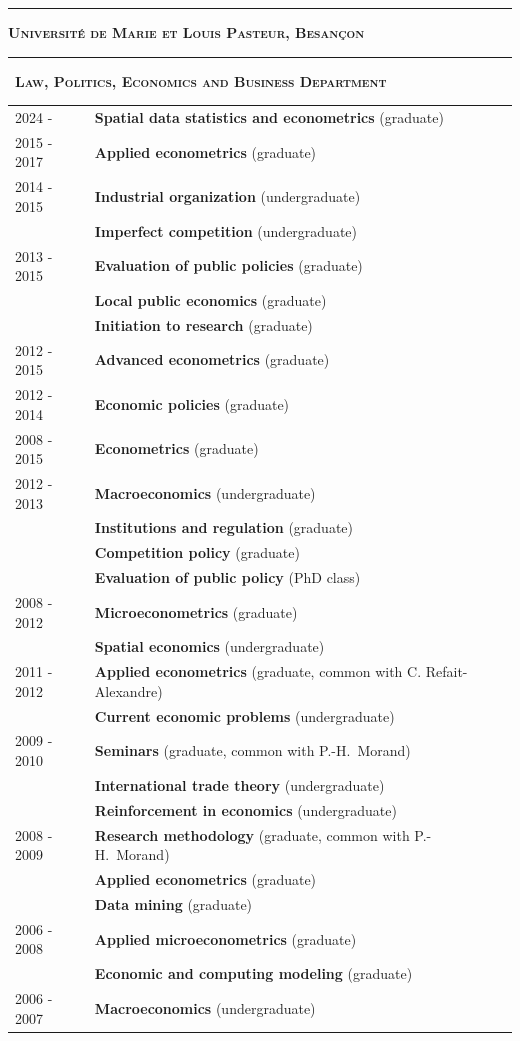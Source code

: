 \documentclass[a4paper,12pt]{article}
\newcommand{\titre}[1]{%
	\bigskip
	\noindent \rule[2mm]{\textwidth}{0.5pt}
	\textbf{\textsc{\large #1}} \\
	\noindent \rule[1mm]{\textwidth}{0.5pt}
	}
\newcommand{\smalltitre}[1]{%
	\noindent \textbullet~\textsc{\textbf{#1}}
	\smallskip
	}
\begin{document}
\titre{Université de Marie et Louis Pasteur, Besançon}

\smalltitre{Law, Politics, Economics and Business Department}

\noindent \begin{longtable}{@{}p{\annee}p{\texte}@{}}
2024 - 		& \textbf{Spatial data statistics and econometrics} (graduate) \\
2015 - 2017	& \textbf{Applied econometrics} (graduate) \\
2014 - 2015	& \textbf{Industrial organization} (undergraduate) \\
			& \textbf{Imperfect competition} (undergraduate) \\
2013 - 2015	& \textbf{Evaluation of public policies} (graduate) \\
			& \textbf{Local public economics} (graduate) \\
			& \textbf{Initiation to research} (graduate) \\
2012 - 2015	& \textbf{Advanced econometrics} (graduate) \\	
2012 - 2014	& \textbf{Economic policies} (graduate) \\		
2008 - 2015	& \textbf{Econometrics} (graduate) \\
2012 - 2013	& \textbf{Macroeconomics} (undergraduate) \\
			& \textbf{Institutions and regulation} (graduate) \\
			& \textbf{Competition policy} (graduate) \\
			& \textbf{Evaluation of public policy} (PhD class) \\
2008 - 2012	& \textbf{Microeconometrics} (graduate) \\
			& \textbf{Spatial economics} (undergraduate) \\
2011 - 2012	& \textbf{Applied econometrics} (graduate, common with C. Refait-Alexandre) \\
			& \textbf{Current economic problems} (undergraduate) \\
2009 - 2010 & \textbf{Seminars} (graduate, common with P.-H.~Morand) \\
		    & \textbf{International trade theory} (undergraduate) \\
			& \textbf{Reinforcement in economics} (undergraduate) \\
2008 - 2009 & \textbf{Research methodology} (graduate, common with P.-H.~Morand) \\
			& \textbf{Applied econometrics} (graduate) \\
			& \textbf{Data mining} (graduate) \\
2006 - 2008 & \textbf{Applied microeconometrics} (graduate) \\
            & \textbf{Economic and computing modeling} (graduate) \\ 
2006 - 2007	& \textbf{Macroeconomics} (undergraduate) \\
\end{longtable}
\end{document}
